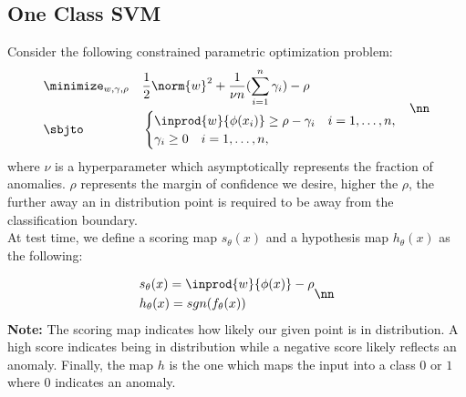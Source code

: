 \documentclass[11pt]{report}
\begin{document}
\subsection{One Class SVM}
Consider the following constrained parametric optimization problem:
\begin{align}
        \label{appen:nlmpp}
        \begin{aligned}
            &\minimize_{w,\gamma,\rho}  && \frac{1}{2}\norm{w}^2+\frac{1}{\nu n}(\sum_{i=1}^{n}\gamma_{i})  - \rho\\
            &\sbjto && \begin{cases}
            \inprod{w}{\phi(x_i)} \geq \rho - \gamma_i \quad i=1,\ldots,n,\\
           \gamma_i \geq 0 \quad i=1,\ldots,n,
            \end{cases}
        \end{aligned} \nn
    \end{align}
where \(\nu\) is a hyperparameter which asymptotically represents the fraction of anomalies. \(\rho\) represents the margin of confidence we desire, higher the \(\rho\), the further away an in distribution point is required to be away from the classification boundary.\\
\vspace{1mm} At test time, we define a scoring map \(s_\theta(x)\) and a hypothesis map \(h_\theta(x)\) as the following:

\begin{align}
        \begin{aligned}
            & s_\theta(x)=\inprod{w}{\phi(x)} - \rho\\
            & h_\theta(x)=sgn(f_\theta(x))
        \end{aligned} \nn
    \end{align}
\textbf{Note:} The scoring map indicates how likely our given point is in distribution. A high score indicates being in distribution while a negative score likely reflects an anomaly. Finally, the map \(h\) is the one which maps the input into a class \(0\) or \(1\) where 0 indicates an anomaly.
\end{document}
